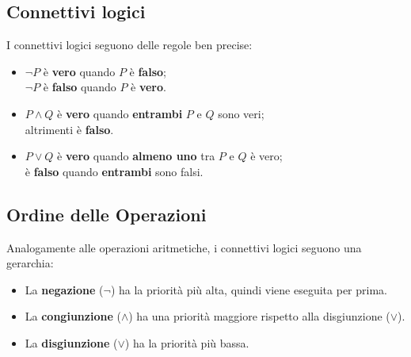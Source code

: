 \subsection{Connettivi logici}



I connettivi logici seguono delle regole ben precise: 
\begin{itemize}
    \item \( \neg P \) è \textbf{vero} quando \( P \) è \textbf{falso}; \\
          \( \neg P \) è \textbf{falso} quando \( P \) è \textbf{vero}.
    
    \item \( P \land Q \) è \textbf{vero} quando \textbf{entrambi} \( P \) e \( Q \) sono veri; \\
          altrimenti è \textbf{falso}.
    
    \item \( P \lor Q \) è \textbf{vero} quando \textbf{almeno uno} tra \( P \) e \( Q \) è vero; \\
          è \textbf{falso} quando \textbf{entrambi} sono falsi.
\end{itemize}


\subsection*{Ordine delle Operazioni}
Analogamente alle operazioni aritmetiche, i connettivi logici seguono una gerarchia:
\begin{itemize}
    \item La \textbf{negazione} (\(\neg\)) ha la priorità più alta, quindi viene eseguita per prima.
    \item La \textbf{congiunzione} (\(\land\)) ha una priorità maggiore rispetto alla disgiunzione (\(\lor\)).
    \item La \textbf{disgiunzione} (\(\lor\)) ha la priorità più bassa.
\end{itemize}


